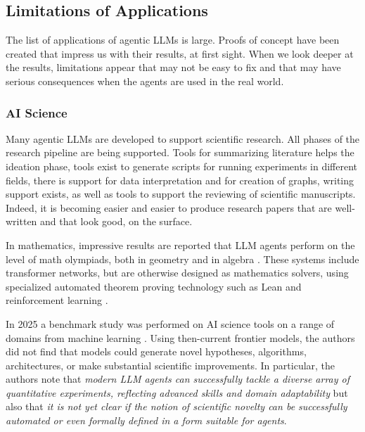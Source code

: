 \subsection{Limitations of Applications}
The list of applications of agentic LLMs is large. Proofs of concept have been created that impress us with their results, at first sight. When we look deeper at the results, limitations appear that may not be easy to fix and that may have serious consequences when the agents are used in the real world. 

\subsubsection{AI Science}
Many agentic LLMs are developed to support scientific research. All phases of the research pipeline are being supported. Tools for summarizing literature helps the ideation phase, tools exist to generate scripts for running experiments in different fields, there is support for data interpretation and for creation of graphs, writing support exists, as well as tools to support the reviewing of scientific manuscripts.  Indeed, it is becoming easier and easier to produce research papers that are well-written and that look good, on the surface. 

In mathematics, impressive results are reported that LLM agents perform on the level of math olympiads, both in geometry \citep{trinh2024solving} and in algebra  \citep{hubert2025olympiad}. These systems include transformer networks, but are otherwise  designed as mathematics solvers, using specialized automated theorem proving technology such as Lean \citep{de2015lean} and reinforcement learning \citep{silver2017mastering,browne2012survey}.

In 2025 a benchmark study was performed on  AI science tools on a range of domains from machine learning \citep{nathani2025mlgym}. Using  then-current frontier models, the authors  did not find that models could generate novel
hypotheses, algorithms, architectures, or make substantial scientific improvements. In particular, the authors note that {\em modern LLM agents can successfully tackle a diverse array of quantitative
experiments, reflecting advanced skills and domain adaptability} but also that {\em it is not yet clear if the notion of scientific novelty can
be successfully automated or even formally defined in a form suitable for agents}.



